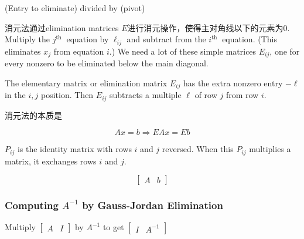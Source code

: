 \begin{definition}[Multiplier]
    (Entry to eliminate) divided by (pivot)
\end{definition}

消元法通过elimination matrices $E$进行消元操作，使得主对角线以下的元素为0. Multiply the $ j^{\text {th }} $ equation by $ \ell_{i j} $ and subtract from the $ i^{\text {th }} $ equation. (This eliminates $ x_{j} $ from equation $ i $.) We need a lot of these simple matrices $ E_{i j} $, one for every nonzero to be eliminated below the main diagonal.

\begin{definition}
    The elementary matrix or elimination matrix $ E_{i j} $ has the extra nonzero entry $ -\ell $ in the $ i, j $ position. Then $ E_{i j} $ subtracts a multiple $ \ell $ of row $ j $ from row $ i $.
\end{definition}

\begin{theorem}
    消元法的本质是

    $$Ax= b \Rightarrow EAx = Eb$$
\end{theorem}

\begin{definition}
    $  P_{i j} $ is the identity matrix with rows $ i $ and $ j $ reversed. When this  $ P_{i j} $ multiplies a matrix, it exchanges rows $ i $ and $ j $.
\end{definition}

\begin{definition}
    $$\displaystyle \left[\begin{matrix}
                A & b
            \end{matrix}\right]$$
\end{definition}

\subsubsection{Computing $A^{-1}$ by Gauss-Jordan Elimination}

\begin{center}
    Multiply $\displaystyle \left[\begin{matrix}
                A & I
            \end{matrix}\right]$ by $\displaystyle A^{-1}$ to get $\displaystyle \left[\begin{matrix}
                I & A^{-1}
            \end{matrix}\right]$
\end{center}


